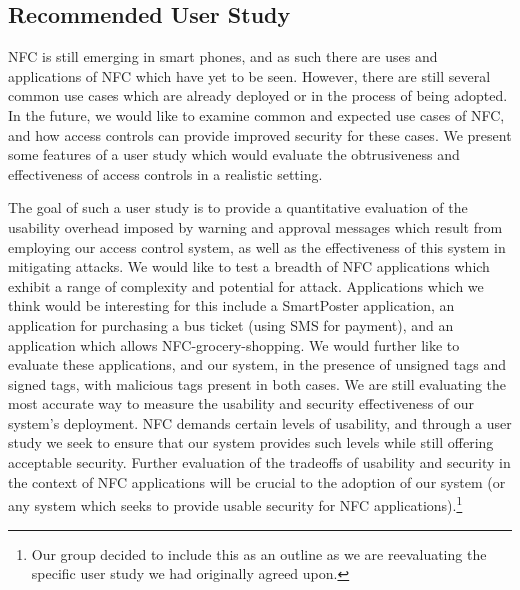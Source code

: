\documentclass[12pt]{article}
\begin{document}
\subsection{Recommended User Study}
NFC is still emerging in smart phones, and as such there are uses and applications of NFC which have yet to be seen.
However, there are still several common use cases which are already deployed or in the process of being adopted.
In the future, we would like to examine common and expected use cases of NFC, and how access controls can provide improved security for these cases.
We present some features of a user study which would evaluate the obtrusiveness and effectiveness of access controls in a realistic setting.

The goal of such a user study is to provide a quantitative evaluation of the usability overhead imposed by warning and approval messages which result from employing our access control system, as well as the effectiveness of this system in mitigating attacks.
We would like to test a breadth of NFC applications which exhibit a range of complexity and potential for attack.
Applications which we think would be interesting for this include a SmartPoster application, an application for purchasing a bus ticket (using SMS for payment), and an application which allows NFC-grocery-shopping.
We would further like to evaluate these applications, and our system, in the presence of unsigned tags and signed tags, with malicious tags present in both cases.
We are still evaluating the most accurate way to measure the usability and security effectiveness of our system's deployment.
NFC demands certain levels of usability, and through a user study we seek to ensure that our system provides such levels while still offering acceptable security.
Further evaluation of the tradeoffs of usability and security in the context of NFC applications will be crucial to the adoption of our system (or any system which seeks to provide usable security for NFC applications).\footnote{Our group decided to include this as an outline as we are reevaluating the specific user study we had originally agreed upon.}
\end{document}
